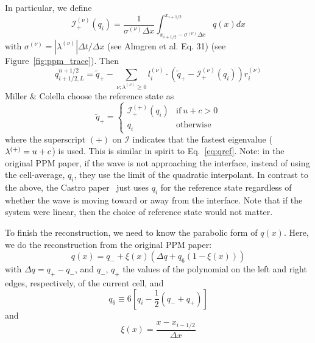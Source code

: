 In particular, we define 
\begin{equation}
\mathcal{I}_+^{(\nu)}(q_i) = \frac{1}{\sigma^{(\nu)} \Delta x} \int _{x_{i+1/2} - \sigma^{(\nu)} \Delta x}^{x_{i+1/2}} q(x) dx
\end{equation} 
with $\sigma^{(\nu)} = |\lambda^{(\nu)}|\Delta t / \Delta x$ (see Almgren et
al. Eq. 31)  (see Figure~\ref{fig:ppm_trace}).  Then
\begin{equation}
q_{i+1/2,L}^{n+1/2} = \tilde{q}_+ -
   \sum_{\nu;\lambda^{(\nu)}\ge 0} l_i^{(\nu)} \cdot \left (
        \tilde{q}_+ - \mathcal{I}_+^{(\nu)}(q_i)
       \right ) r_i^{(\nu)}  \label{eq:ppmtrace}
\end{equation}
Miller \& Colella choose the reference state as
\begin{equation}
\tilde{q}_+ = \left \{ \begin{array}{cc} 
       \mathcal{I}_+^{(+)}(q_i) & \mathrm{if~} u + c > 0 \\
       q_i                    & \mathrm{otherwise}
\end{array}
\right .
\end{equation}
where the superscript $(+)$ on $\mathcal{I}$ indicates that the
fastest eigenvalue ($\lambda^{(+)} = u + c$) is used.  This is similar in
spirit to Eq.~\ref{eq:qref}.  Note: in the original PPM paper, if the
wave is not approaching the interface, instead of using the
cell-average, $q_i$, they use the limit of the quadratic interpolant.
In contrast to the above, the Castro paper~\cite{almgren:2010} just
uses $q_i$ for the reference state regardless of whether the wave is
moving toward or away from the interface.  Note that if the system
were linear, then the choice of reference state would not matter.

To finish the reconstruction, we need to know the parabolic form
of $q(x)$.  Here, we do the reconstruction from the original PPM
paper:
\begin{equation}
q(x) = q_{-} + \xi(x) \left ( \Delta q + q_6 (1 - \xi(x) ) \right )
\end{equation}
with $\Delta q = q_+ - q_-$, and $q_-$, $q_+$ the values of the polynomial
on the left and right edges, respectively, of the current cell, and 
\begin{equation}
q_6 \equiv 6 \left [ q_i - \frac{1}{2} (q_- + q_+) \right ]
\end{equation}
and
\begin{equation}
\xi(x) = \frac{x - x_{i-1/2}}{\Delta x}
\end{equation}

